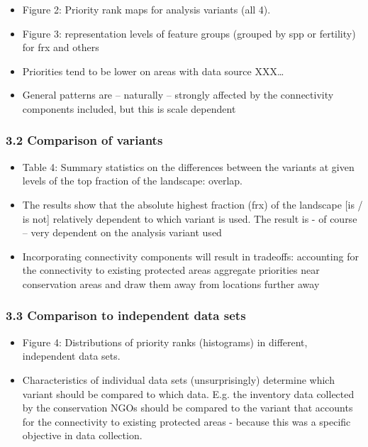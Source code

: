 \documentclass[]{article}
\begin{document}
\begin{itemize}
\itemsep1pt\parskip0pt
\item
  Figure 2: Priority rank maps for analysis variants (all 4).
\item
  Figure 3: representation levels of feature groups (grouped by spp or
  fertility) for frx and others
\item
  Priorities tend to be lower on areas with data source XXX\ldots{}
\item
  General patterns are -- naturally -- strongly affected by the
  connectivity components included, but this is scale dependent
\end{itemize}

\subsubsection{3.2 Comparison of variants}

\begin{itemize}
\itemsep1pt\parskip0pt
\item
  Table 4: Summary statistics on the differences between the variants at
  given levels of the top fraction of the landscape: overlap.
\item
  The results show that the absolute highest fraction (frx) of the
  landscape {[}is / is not{]} relatively dependent to which variant is
  used. The result is - of course -- very dependent on the analysis
  variant used
\item
  Incorporating connectivity components will result in tradeoffs:
  accounting for the connectivity to existing protected areas aggregate
  priorities near conservation areas and draw them away from locations
  further away
\end{itemize}

\subsubsection{3.3 Comparison to independent data sets}

\begin{itemize}
\itemsep1pt\parskip0pt
\item
  Figure 4: Distributions of priority ranks (histograms) in different,
  independent data sets.
\item
  Characteristics of individual data sets (unsurprisingly) determine
  which variant should be compared to which data. E.g. the inventory
  data collected by the conservation NGOs should be compared to the
  variant that accounts for the connectivity to existing protected areas
  - because this was a specific objective in data collection.
\end{itemize}
\end{document}

